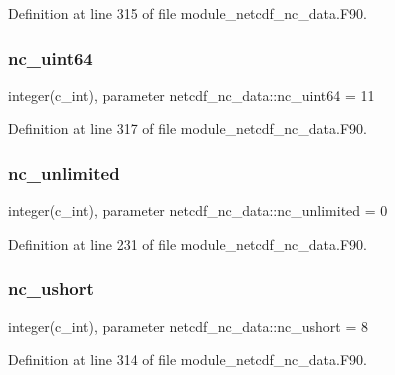 Definition at line 315 of file module\+\_\+netcdf\+\_\+nc\+\_\+data.\+F90.

\mbox{\label{namespacenetcdf__nc__data_a94f8f441963ecaa1fb1cecf853bcddd0}} 
\subsubsection{\texorpdfstring{nc\+\_\+uint64}{nc\_uint64}}
{\footnotesize\ttfamily integer(c\+\_\+int), parameter netcdf\+\_\+nc\+\_\+data\+::nc\+\_\+uint64 = 11}



Definition at line 317 of file module\+\_\+netcdf\+\_\+nc\+\_\+data.\+F90.

\mbox{\label{namespacenetcdf__nc__data_a81d34a59d48d58dcb6e72304443038de}} 
\subsubsection{\texorpdfstring{nc\+\_\+unlimited}{nc\_unlimited}}
{\footnotesize\ttfamily integer(c\+\_\+int), parameter netcdf\+\_\+nc\+\_\+data\+::nc\+\_\+unlimited = 0}



Definition at line 231 of file module\+\_\+netcdf\+\_\+nc\+\_\+data.\+F90.

\mbox{\label{namespacenetcdf__nc__data_a78be4744628e5b0e6599cb681fa4c050}} 
\subsubsection{\texorpdfstring{nc\+\_\+ushort}{nc\_ushort}}
{\footnotesize\ttfamily integer(c\+\_\+int), parameter netcdf\+\_\+nc\+\_\+data\+::nc\+\_\+ushort = 8}



Definition at line 314 of file module\+\_\+netcdf\+\_\+nc\+\_\+data.\+F90.


